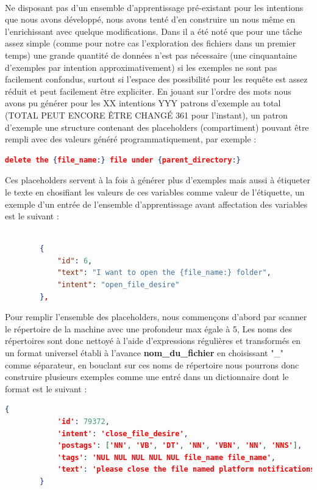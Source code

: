 		\paragraph{}
		\label{nlu_dataset}
		Ne disposant pas d'un ensemble d'apprentissage pré-existant pour les intentions que nous avons développé, nous avons tenté d'en construire un nous même en l'enrichissant avec quelque modifications. Dans \cite{rasa_nlu} il a été noté que pour une tâche assez simple (comme pour notre cas l'exploration des fichiers dans un premier temps) une grande quantité de données n'est pas nécessaire (une cinquantaine d'exemples par intention approximativement) si les exemples ne sont pas facilement confondus, surtout si l'espace des possibilité pour les requête est assez réduit et peut facilement être expliciter. En jouant sur l'ordre des mots nous avons pu générer pour les XX intentions YYY patrons d'exemple au total (TOTAL PEUT ENCORE ÊTRE CHANGÉ 361 pour l'instant), un patron d'exemple une structure contenant des placeholders (compartiment) pouvant être rempli avec des valeurs généré programmatiquement, par exemple : 
		\begin{lstlisting}[language=json]
		delete the {file_name:} file under {parent_directory:}\end{lstlisting}
		Ces placeholders servent à la fois à générer plus d'exemples mais aussi à étiqueter le texte en chosifiant les valeurs de ces variables comme valeur de l'étiquette, un exemple d'un entrée de l'ensemble d'apprentissage avant affectation des variables est le suivant : 
		\begin{lstlisting}[language=json]
		
		{
			"id": 6,
			"text": "I want to open the {file_name:} folder",
			"intent": "open_file_desire"
		},
		\end{lstlisting}
		Pour remplir l'ensemble des placeholders, nous commençons d'abord par scanner le répertoire de la machine avec une profondeur max égale à 5,
		Les noms des répertoires sont donc nettoyé à l'aide d'expressions régulières et transformés en un format universel établi à l'avance \textbf{nom\_du\_fichier} en choisissant "\_" comme séparateur, en bouclant sur ces noms de répertoire nous pourrons donc construire plusieurs exemples comme une entré dans un dictionnaire dont le format est le suivant : 
		\begin{lstlisting}[language=json]
		{
			'id': 79372,
			'intent': 'close_file_desire',
			'postags': ['NN', 'VB', 'DT', 'NN', 'VBN', 'NN', 'NNS'],
			'tags': 'NUL NUL NUL NUL NUL file_name file_name',
			'text': 'please close the file named platform notifications'
		}
		\end{lstlisting}
